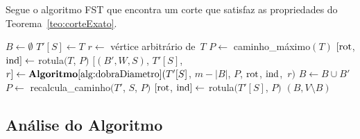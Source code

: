 


		Segue o algoritmo FST que encontra um corte que satisfaz as 
		propriedades do Teorema~\ref{teo:corteExato}.
		
		\bigskip

		\begin{algorithm}[H]
		\label{alg:corteExato}

			\caption{}
			$B\gets \emptyset$\;
			$T'[S]\gets T$\;
			$r\gets$ vértice arbitrário de~$T$\;
			$P\gets$ {\sc caminho\_máximo}$(T)$\;
			$[\mathrm{rot}$, $\mathrm{ind}]\gets$ {\sc rotula}$(T$, $P)$\;
			{
				$[(B',W,S)$, $T'[S]$, $r]\gets
					\mathbf {Algoritmo\ref{alg:dobraDiametro}}(T'[S]$,
					$m-|B|$, $P$, $\mathrm{rot}$, $\mathrm{ind}$,~$r)$\;
				$B\gets B\cup B'$\;
				$P\gets$ {\sc recalcula\_caminho}$(T'$, $S$, $P)$\;
				$[\mathrm{rot}$, $\mathrm{ind}]\gets$ {\sc rotula}$(T'[S]$, $P)$
			}
			\Return $(B,V\setminus B)$\;

		\end{algorithm}	

		\bigskip

		\subsection*{Análise do Algoritmo}


